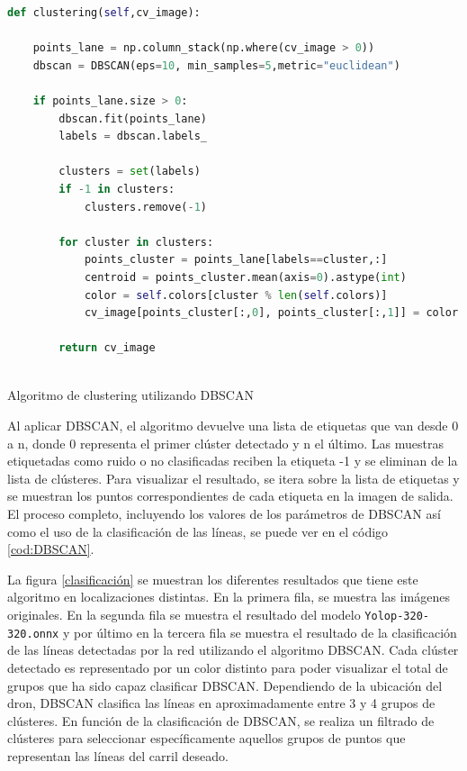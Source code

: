 \begin{code}[h]
  \begin{footnotesize}
  \begin{lstlisting}[language=Python]
    def clustering(self,cv_image):
    
    points_lane = np.column_stack(np.where(cv_image > 0))
    dbscan = DBSCAN(eps=10, min_samples=5,metric="euclidean")

    if points_lane.size > 0:
        dbscan.fit(points_lane)
        labels = dbscan.labels_

        clusters = set(labels)
        if -1 in clusters:
            clusters.remove(-1)
    
        for cluster in clusters:
            points_cluster = points_lane[labels==cluster,:]
            centroid = points_cluster.mean(axis=0).astype(int)
            color = self.colors[cluster % len(self.colors)]
            cv_image[points_cluster[:,0], points_cluster[:,1]] = color

        return cv_image
  
  \end{lstlisting}
  \caption[Algoritmo de clustering utilizando DBSCAN]{Algoritmo de clustering utilizando DBSCAN}
  \label{cod:DBSCAN}
  \end{footnotesize}
  \end{code}  


Al aplicar DBSCAN, el algoritmo devuelve una lista de etiquetas que van desde 0 a n, 
donde 0 representa el primer clúster detectado y n el último. Las muestras etiquetadas como ruido o no clasificadas reciben la etiqueta -1 y se eliminan de la lista de clústeres. Para visualizar 
el resultado, se itera sobre la lista de etiquetas y se muestran los puntos correspondientes de cada etiqueta en la imagen de salida. El proceso completo, incluyendo los valores 
de los parámetros de DBSCAN así como el uso de la clasificación de las líneas, se puede ver en el código \ref{cod:DBSCAN}. \newline

La figura \ref{clasificación} se muestran los diferentes resultados que tiene este algoritmo en localizaciones distintas. En la primera fila, se muestra las imágenes originales. En la segunda 
fila se muestra el resultado del modelo \texttt{Yolop-320-320.onnx} y por último en la tercera fila se muestra el resultado de la clasificación de las líneas detectadas por la red 
utilizando el algoritmo DBSCAN. Cada clúster detectado es representado por un color distinto para poder visualizar el total de grupos que ha sido capaz clasificar DBSCAN.
Dependiendo de la ubicación del dron, DBSCAN clasifica las líneas en aproximadamente entre 3 y 4 grupos de clústeres. En función de la clasificación de DBSCAN, se realiza 
un filtrado de clústeres para seleccionar específicamente aquellos grupos de puntos que representan las líneas del carril deseado.

